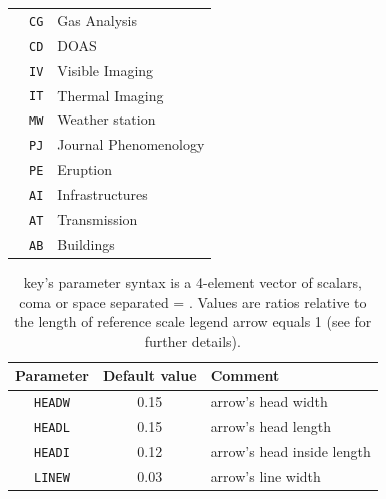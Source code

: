 \begin{table}
\begin{center}
\begin{tabular}{|c|c|l|}
      			             & \texttt{CG}	&	Gas Analysis\\
      			             & \texttt{CD}	&	DOAS\\
      			             & \texttt{IV}	&	Visible Imaging\\
      			             & \texttt{IT}	&	Thermal Imaging\\
      			             & \texttt{MW}	&	Weather station\\
      			             & \texttt{PJ}	&	Journal Phenomenology\\
      			             & \texttt{PE}	&	Eruption\\
      			             & \texttt{AI}	&	Infrastructures\\
      			             & \texttt{AT}	&	Transmission\\
      			             & \texttt{AB}	&	Buildings\\
\hline
\end{tabular}
\end{center}
\end{table}


\begin{table}
\caption{ key's parameter syntax is a 4-element vector of scalars, coma or space separated = . Values are ratios relative to the length of reference scale legend arrow equals 1 (see  for further details).}
\label{arrowshape}
\begin{center}
\begin{tabular}{|c|c|l|}
\hline
\textbf{Parameter} & \textbf{Default value} & \textbf{Comment}\\
\hline
\texttt{HEADW}	& 0.15	& arrow's head width\\
\hline
\texttt{HEADL}	& 0.15	& arrow's head length\\
\hline
\texttt{HEADI}	& 0.12	& arrow's head inside length\\
\hline
\texttt{LINEW}	& 0.03	& arrow's line width\\
\hline
\end{tabular}
\end{center}
\label{nodeidcodes}
\end{table}
